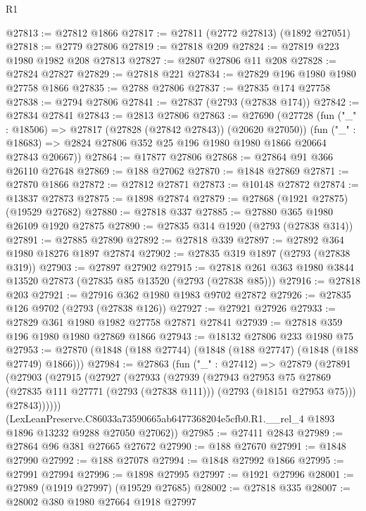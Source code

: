 \begin{lexlean}{R1}
\begin{coremodule}
@27813 := @27812 @1866
@27817 := @27811 (@2772 @27813) (@1892 @27051)
@27818 := @2779 @27806
@27819 := @27818 @209
@27824 := @27819 @223 @1980 @1982 @208 @27813
@27827 := @2807 @27806 @11 @208
@27828 := @27824 @27827
@27829 := @27818 @221
@27834 := @27829 @196 @1980 @1980 @27758 @1866
@27835 := @2788 @27806
@27837 := @27835 @174 @27758
@27838 := @2794 @27806
@27841 := @27837 (@2793 (@27838 @174))
@27842 := @27834 @27841
@27843 := @2813 @27806
@27863 := @27690
    (@27728
      (fun ("_" : @18506) => @27817 (@27828 (@27842 @27843)) (@20620 @27050))
      (fun ("_" : @18683) => @2824 @27806 @352 @25 @196 @1980 @1980 @1866 @20664 @27843 @20667))
@27864 := @17877 @27806
@27868 := @27864 @91 @366 @26110 @27648
@27869 := @188 @27062
@27870 := @1848 @27869
@27871 := @27870 @1866
@27872 := @27812 @27871
@27873 := @10148 @27872
@27874 := @13837 @27873
@27875 := @1898 @27874
@27879 := @27868 (@1921 @27875) (@19529 @27682)
@27880 := @27818 @337
@27885 := @27880 @365 @1980 @26109 @1920 @27875
@27890 := @27835 @314 @1920 (@2793 (@27838 @314))
@27891 := @27885 @27890
@27892 := @27818 @339
@27897 := @27892 @364 @1980 @18276 @1897 @27874
@27902 := @27835 @319 @1897 (@2793 (@27838 @319))
@27903 := @27897 @27902
@27915 := @27818 @261 @363 @1980 @3844 @13520 @27873 (@27835 @85 @13520 (@2793 (@27838 @85)))
@27916 := @27818 @203
@27921 := @27916 @362 @1980 @1983 @9702 @27872
@27926 := @27835 @126 @9702 (@2793 (@27838 @126))
@27927 := @27921 @27926
@27933 := @27829 @361 @1980 @1982 @27758 @27871 @27841
@27939 := @27818 @359 @196 @1980 @1980 @27869 @1866
@27943 := @18132 @27806 @233 @1980 @75
@27953 := @27870 (@1848 (@188 @27744) (@1848 (@188 @27747) (@1848 (@188 @27749) @1866)))
@27984 := @27863
    (fun ("_" : @27412) =>
    @27879
      (@27891
        (@27903
          (@27915
            (@27927
              (@27933
                (@27939
                  (@27943
                    @27953
                    @75
                    @27869
                    (@27835 @111 @27771 (@2793 (@27838 @111)))
                    (@2793 (@18151 @27953 @75)))
                  @27843))))))
      (LexLeanPreserve.C86033a73590665ab6477368204e5cfb0.R1.__rel_4
        @1893
        @1896
        @13232
        @9288
        @27050
        @27062))
@27985 := @27411 @2843
@27989 := @27864 @96 @381 @27665 @27672
@27990 := @188 @27670
@27991 := @1848 @27990
@27992 := @188 @27078
@27994 := @1848 @27992 @1866
@27995 := @27991 @27994
@27996 := @1898 @27995
@27997 := @1921 @27996
@28001 := @27989 (@1919 @27997) (@19529 @27685)
@28002 := @27818 @335
@28007 := @28002 @380 @1980 @27664 @1918 @27997

\end{coremodule}
\end{lexlean}
